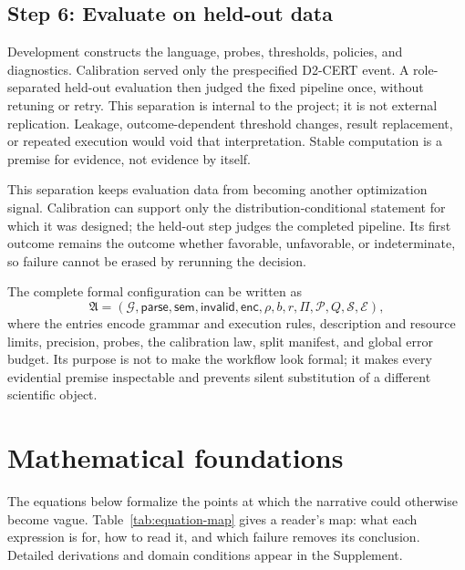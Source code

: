 \documentclass[10pt]{article}
\theoremstyle{definition}
\begin{document}
\subsection{Step 6: Evaluate on held-out data}

Development constructs the language, probes, thresholds, policies, and diagnostics. Calibration
served only the prespecified D2-CERT event. A role-separated held-out evaluation then judged the
fixed pipeline once, without retuning or retry. This separation is internal to the project; it is
not external replication. Leakage, outcome-dependent threshold changes, result replacement, or
repeated execution would void that interpretation. Stable computation is a premise for evidence,
not evidence by itself.

This separation keeps evaluation data from becoming another optimization signal. Calibration can
support only the distribution-conditional statement for which it was designed; the held-out step
judges the completed pipeline. Its first outcome remains the outcome whether favorable,
unfavorable, or indeterminate, so failure cannot be erased by rerunning the decision.

The complete formal configuration can be written as
\[
\mathfrak A=(\mathcal G,\mathsf{parse},\mathsf{sem},\mathsf{invalid},
\mathsf{enc},\rho,b,r,\Pi,\mathcal P,Q,\mathcal S,\mathcal E),
\]
where the entries encode grammar and execution rules, description and resource limits, precision,
probes, the calibration law, split manifest, and global error budget. Its purpose is not to make
the workflow look formal; it makes every evidential premise inspectable and prevents silent
substitution of a different scientific object.

\section{Mathematical foundations}
\label{sec:formal}

The equations below formalize the points at which the narrative could otherwise become vague.
Table~\ref{tab:equation-map} gives a reader's map: what each expression is for, how to read it, and
which failure removes its conclusion. Detailed derivations and domain conditions appear in the
Supplement.
\end{document}
